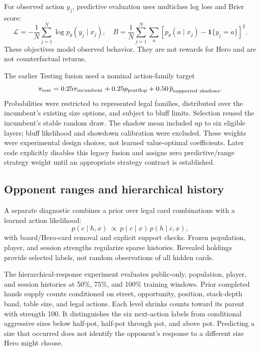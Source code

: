 \documentclass[11pt]{article}
\begin{document}
For observed action \(y_j\), predictive evaluation uses multiclass log loss and Brier score:
\begin{equation}
\mathcal{L}=-\frac{1}{N}\sum_{j=1}^{N}\log p_\theta(y_j\mid x_j),\quad
B=\frac{1}{N}\sum_{j=1}^{N}\sum_a
\left[p_\theta(a\mid x_j)-\mathbf{1}\{y_j=a\}\right]^2.
\end{equation}
These objectives model observed behavior. They are not rewards for Hero and are not counterfactual returns.

The earlier Testing fusion used a nominal action-family target
\begin{equation}
\pi_{\rm test}=0.25\pi_{\rm incumbent}+0.25p_{\rm postflop}
+0.50\,\overline{p}_{\rm supported\ shadows}.
\end{equation}
Probabilities were restricted to represented legal families, distributed over the incumbent's existing size options, and subject to bluff limits. Selection reused the incumbent's stable random draw. The shadow mean included up to six eligible layers; bluff likelihood and showdown calibration were excluded. These weights were experimental design choices, not learned value-optimal coefficients. Later code explicitly disables this legacy fusion and assigns zero predictive/range strategy weight until an appropriate strategy contract is established.

\subsection{Opponent ranges and hierarchical history}
A separate diagnostic combines a prior over legal card combinations with a learned action likelihood:
\begin{equation}
p(c\mid h,x)\ \propto\ p(c\mid x)\,p(h\mid c,x),
\end{equation}
with board/Hero-card removal and explicit support checks. Frozen population, player, and session strengths regularize sparse histories. Revealed holdings provide selected labels, not random observations of all hidden cards.

The hierarchical-response experiment evaluates public-only, population, player, and session histories at 50\%, 75\%, and 100\% training windows. Prior completed hands supply counts conditioned on street, opportunity, position, stack-depth band, table size, and legal actions. Each level shrinks counts toward its parent with strength 100. It distinguishes the six next-action labels from conditional aggressive sizes below half-pot, half-pot through pot, and above pot. Predicting a size that occurred does not identify the opponent's response to a different size Hero might choose.
\end{document}
